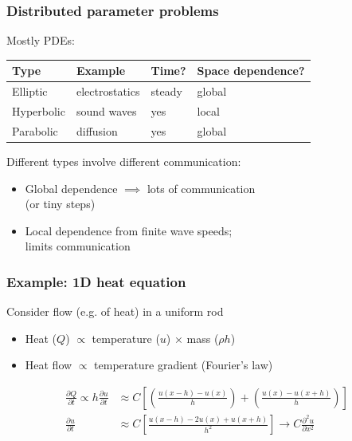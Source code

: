 \documentclass{beamer}
\begin{document}
\begin{frame}
  \frametitle{Distributed parameter problems}

  Mostly PDEs:
  \begin{center}
  \begin{tabular}{llll}
    Type & Example & Time? & Space dependence? \\
    \hline
    Elliptic & electrostatics & steady & global \\
    Hyperbolic & sound waves & yes & local \\
    Parabolic  & diffusion   & yes & global
  \end{tabular}
  \end{center}

  \vspace{5mm}
  Different types involve different communication:
  \begin{itemize}
  \item Global dependence $\implies$ lots of communication \\
    (or tiny steps)
  \item Local dependence from finite wave speeds; \\
    limits communication
  \end{itemize}

\end{frame}


\begin{frame}
  \frametitle{Example: 1D heat equation}

  \begin{center}
    
  \end{center}

  Consider flow (e.g. of heat) in a uniform rod
  \begin{itemize}
  \item Heat ($Q$) $\propto$ 
    temperature ($u$) $\times$ mass ($\rho h$)
  \item Heat flow $\propto$ temperature gradient (Fourier's law)
  \end{itemize}

  \begin{align*}
     \frac{\partial Q}{\partial t} \propto
     h \frac{\partial u}{\partial t} &\approx
     C \left[ \left( \frac{u(x-h)-u(x)}{h} \right) +
              \left( \frac{u(x)-u(x+h)}{h} \right) \right] \\
    \frac{\partial u}{\partial t} &\approx
    C \left[ \frac{u(x-h)-2u(x)+u(x+h)}{h^2} \right] \rightarrow
    C \frac{\partial^2 u}{\partial x^2}
  \end{align*}
  
\end{frame}
\end{document}
